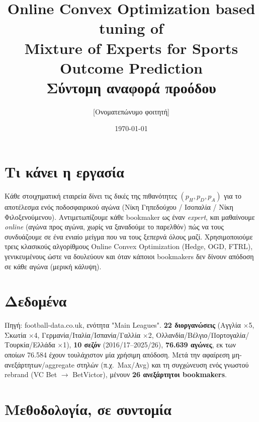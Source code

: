 \documentclass[11pt,a4paper]{article}
\title{\textbf{Online Convex Optimization based tuning of\\ Mixture of Experts for Sports Outcome Prediction}\\[6pt]
\large Σύντομη αναφορά προόδου}
\author{[Ονοματεπώνυμο φοιτητή]}
\date{\today}
\renewcommand{\_}{\oldunderscore\allowbreak}
\begin{document}
\maketitle

\section{Τι κάνει η εργασία}

Κάθε στοιχηματική εταιρεία δίνει τις δικές της πιθανότητες $(p_H, p_D, p_A)$ για το
αποτέλεσμα ενός ποδοσφαιρικού αγώνα (Νίκη Γηπεδούχου / Ισοπαλία / Νίκη Φιλοξενούμενου).
Αντιμετωπίζουμε κάθε bookmaker ως έναν \emph{expert}, και μαθαίνουμε \emph{online}
(αγώνα προς αγώνα, χωρίς να ξαναδούμε το παρελθόν) πώς να τους συνδυάζουμε σε ένα ενιαίο
μείγμα που να τους ξεπερνά όλους μαζί. Χρησιμοποιούμε τρεις κλασικούς αλγορίθμους Online
Convex Optimization (Hedge, OGD, FTRL), γενικευμένους ώστε να δουλεύουν και όταν κάποιοι
bookmakers δεν δίνουν απόδοση σε κάθε αγώνα (μερική κάλυψη).

\section{Δεδομένα}

Πηγή: football-data.co.uk, ενότητα "Main Leagues". \textbf{22 διοργανώσεις}
(Αγγλία $\times$5, Σκωτία $\times$4, Γερμανία/Ιταλία/Ισπανία/Γαλλία $\times$2,
Ολλανδία/Βέλγιο/Πορτογαλία/Τουρκία/Ελλάδα $\times$1), \textbf{10 σεζόν} (2016/17--2025/26),
\textbf{76.639 αγώνες}, εκ των οποίων 76.584 έχουν τουλάχιστον μία χρήσιμη απόδοση.
Μετά την αφαίρεση μη-ανεξάρτητων/aggregate στηλών (π.χ.\ Max/Avg) και τη συγχώνευση ενός
γνωστού rebrand (VC Bet $\to$ BetVictor), μένουν \textbf{26 ανεξάρτητοι bookmakers}.

\section{Μεθοδολογία, σε συντομία}
\end{document}
